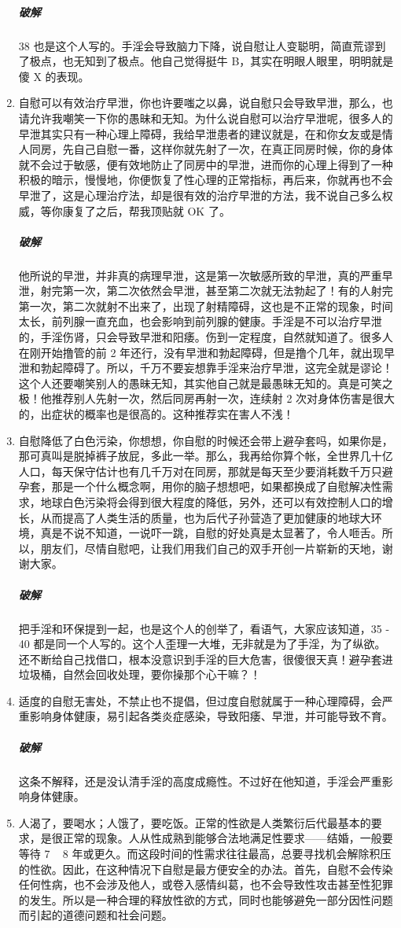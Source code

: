 \begin{enumerate}
    \subparagraph{破解} 38 也是这个人写的。手淫会导致脑力下降，说自慰让人变聪明，简直荒谬到了极点，也无知到了极点。他自己觉得挺牛 B，其实在明眼人眼里，明明就是傻 X 的表现。
    \item 自慰可以有效治疗早泄，你也许要嗤之以鼻，说自慰只会导致早泄，那么，也请允许我嘲笑一下你的愚昧和无知。为什么说自慰可以治疗早泄呢，很多人的早泄其实只有一种心理上障碍，我给早泄患者的建议就是，在和你女友或是情人同房，先自己自慰一番，这样你就先射了一次，在真正同房时候，你的身体就不会过于敏感，便有效地防止了同房中的早泄，进而你的心理上得到了一种积极的暗示，慢慢地，你便恢复了性心理的正常指标，再后来，你就再也不会早泄了，这是心理治疗法，却是很有效的治疗早泄的方法，我不说自己多么权威，等你康复了之后，帮我顶贴就 OK 了。
    \subparagraph{破解} 他所说的早泄，并非真的病理早泄，这是第一次敏感所致的早泄，真的严重早泄，射完第一次，第二次依然会早泄，甚至第二次就无法勃起了！有的人射完第一次，第二次就射不出来了，出现了射精障碍，这也是不正常的现象，时间太长，前列腺一直充血，也会影响到前列腺的健康。手淫是不可以治疗早泄的，手淫伤肾，只会导致早泄和阳痿。伤到一定程度，自然就知道了。很多人在刚开始撸管的前 2 年还行，没有早泄和勃起障碍，但是撸个几年，就出现早泄和勃起障碍了。所以，千万不要妄想靠手淫来治疗早泄，这完全就是谬论！这个人还要嘲笑别人的愚昧无知，其实他自己就是最愚昧无知的。真是可笑之极！他推荐别人先射一次，然后同房再射一次，连续射 2 次对身体伤害是很大的，出症状的概率也是很高的。这种推荐实在害人不浅！
    \item 自慰降低了白色污染，你想想，你自慰的时候还会带上避孕套吗，如果你是，那可真叫是脱掉裤子放屁，多此一举。那么，我再给你算个帐，全世界几十亿人口，每天保守估计也有几千万对在同房，那就是每天至少要消耗数千万只避孕套，那是一个什么概念啊，用你的脑子想想吧，如果都换成了自慰解决性需求，地球白色污染将会得到很大程度的降低，另外，还可以有效控制人口的增长，从而提高了人类生活的质量，也为后代子孙营造了更加健康的地球大环境，真是不说不知道，一说吓一跳，自慰的好处真是太显著了，令人咂舌。所以，朋友们，尽情自慰吧，让我们用我们自己的双手开创一片崭新的天地，谢谢大家。
    \subparagraph{破解} 把手淫和环保提到一起，也是这个人的创举了，看语气，大家应该知道，35 - 40 都是同一个人写的。这个人歪理一大堆，无非就是为了手淫，为了纵欲。还不断给自己找借口，根本没意识到手淫的巨大危害，很傻很天真！避孕套进垃圾桶，自然会回收处理，要你操那个心干嘛？！
    \item 适度的自慰无害处，不禁止也不提倡，但过度自慰就属于一种心理障碍，会严重影响身体健康，易引起各类炎症感染，导致阳痿、早泄，并可能导致不育。
    \subparagraph{破解} 这条不解释，还是没认清手淫的高度成瘾性。不过好在他知道，手淫会严重影响身体健康。
    \item 人渴了，要喝水；人饿了，要吃饭。正常的性欲是人类繁衍后代最基本的要求，是很正常的现象。人从性成熟到能够合法地满足性要求——结婚，一般要等待 7 ~ 8 年或更久。而这段时间的性需求往往最高，总要寻找机会解除积压的性欲。因此，在这种情况下自慰是最方便安全的办法。首先，自慰不会传染任何性病，也不会涉及他人，或卷入感情纠葛，也不会导致性攻击甚至性犯罪的发生。所以是一种合理的释放性欲的方式，同时也能够避免一部分因性问题而引起的道德问题和社会问题。

\end{enumerate}
